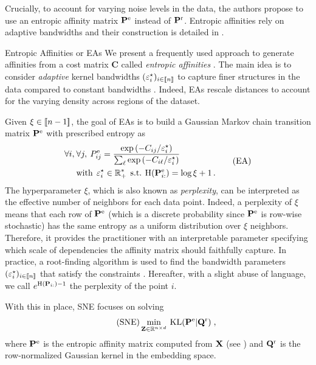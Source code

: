 Crucially, to account for varying noise levels in the data, the authors propose to use an entropic affinity matrix ${\mathbf{P}}^{\mathrm{e}}$ instead of ${\mathbf{P}}^{\mathrm{r}}$. Entropic affinities rely on adaptive bandwidths and their construction is detailed in .

\begin{mem1}{Entropic Affinities or EAs}\label{mem:entropic_affinities}
We present a frequently used approach to generate affinities from a cost matrix $\mathbf{C}$ called \emph{entropic affinities}  \citep{hinton2002stochastic}. The main idea is to consider \emph{adaptive} kernel bandwidths $(\varepsilon^\star_i)_{i \in {[\![n]\!]}}$ to capture finer structures in the data compared to constant bandwidths \citep{van2018recovering}. Indeed, EAs rescale distances to account for the varying density across regions of the dataset.

Given $\xi \in {[\![n-1]\!]}$, the goal of EAs is to build a Gaussian Markov chain transition matrix ${\mathbf{P}}^{\mathrm{e}}$ with prescribed entropy as
\begin{equation}
\begin{split}
    \forall i, \: &\forall j, \: P^{\mathrm{e}}_{ij} = \frac{\exp{(-C_{ij}/\varepsilon^\star_i)}}{\sum_\ell \exp{(-C_{i\ell}/\varepsilon^\star_i)}} \\
    &\text{with} \:\: \varepsilon^\star_i \in \mathbb{R}^*_+ \:\: \text{s.t.} \: \operatorname{H}({\mathbf{P}}^{\mathrm{e}}_{i:}) = \log{\xi} + 1\,. \label{eq:entropic_affinity_pb}
\end{split}\tag{EA}
\end{equation}
The hyperparameter $\xi$, which is also known as \emph{perplexity}, can be interpreted as the effective number of neighbors for each data point. Indeed, a perplexity of $\xi$ means that each row of ${\mathbf{P}}^{\mathrm{e}}$ (which is a discrete probability since ${\mathbf{P}}^{\mathrm{e}}$ is row-wise stochastic) has the same entropy as a uniform distribution over $\xi$ neighbors. Therefore, it provides the practitioner with an interpretable parameter specifying which scale of dependencies the affinity matrix should faithfully capture. In practice, a root-finding algorithm is used to find the bandwidth parameters $(\varepsilon_i^\star)_{i \in {[\![n]\!]}}$ that satisfy the constraints \citep{vladymyrov2013entropic}. Hereafter, with a slight abuse of language, we call $e^{\operatorname{H}({\mathbf{P}}_{i:})-1}$ the perplexity of the point $i$.
\end{mem1}

With this in place, SNE focuses on solving
\begin{align}\label{eq:SNE_pb}\tag{SNE}
    \min_{{\mathbf{Z}} \in \mathbb{R}^{n \times d}} \: \operatorname{KL}({\mathbf{P}}^{\mathrm{e}} | {\mathbf{Q}}^{\mathrm{r}}) \;,
\end{align}
where ${\mathbf{P}}^{\mathrm{e}}$ is the entropic affinity matrix computed from ${\mathbf{X}}$ (see ) and ${\mathbf{Q}}^{\mathrm{r}}$ is the row-normalized Gaussian kernel in the embedding space.

